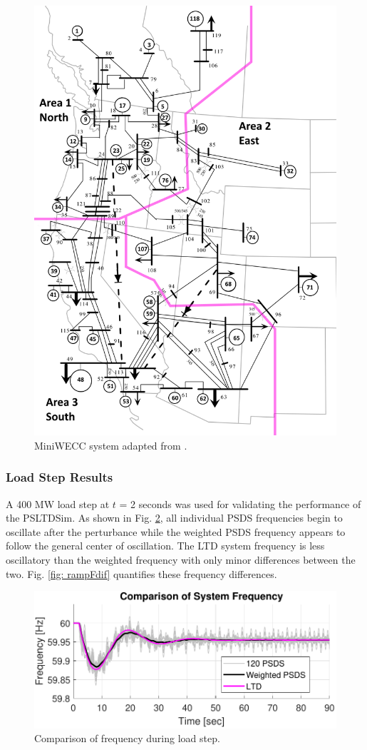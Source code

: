 \begin{figure}[!ht]
	\centering
	\includegraphics[width=.65\linewidth]{figures/miniWECC_split03}
	\caption{MiniWECC system adapted from \cite{trudnowski2012}.}
	\label{fig: miniWECC}
\end{figure}

\subsubsection{Load Step Results}
A 400 MW load step at $t$ = 2 seconds was used for validating the performance of the PSLTDSim.
As shown in Fig. \ref{fig: stepFcomp}, all individual PSDS frequencies begin to oscillate after the perturbance while the weighted PSDS frequency appears to follow the general center of oscillation. The LTD system frequency is less oscillatory than the weighted frequency with only minor differences between the two. Fig. \ref{fig: rampFdif} quantifies these frequency differences.

\begin{figure}[!t]
	\centering
	\includegraphics[width=\linewidth]{figures/miniWECC3ALTDstepF3}
	\caption{Comparison of frequency during load step.}
	\label{fig: stepFcomp}
\end{figure}

